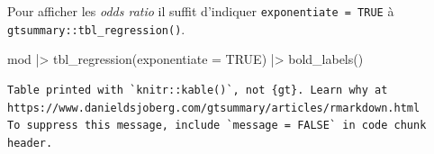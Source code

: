 \documentclass[
  letterpaper,
  DIV=11,
  numbers=noendperiod,
  oneside]{scrreprt}
\newenvironment{Shaded}{\begin{snugshade}}{\end{snugshade}}
\newcommand{\AttributeTok}[1]{\textcolor[rgb]{0.40,0.45,0.13}{#1}}
\newcommand{\ConstantTok}[1]{\textcolor[rgb]{0.56,0.35,0.01}{#1}}
\newcommand{\FunctionTok}[1]{\textcolor[rgb]{0.28,0.35,0.67}{#1}}
\newcommand{\NormalTok}[1]{\textcolor[rgb]{0.00,0.23,0.31}{#1}}
\newcommand{\SpecialCharTok}[1]{\textcolor[rgb]{0.37,0.37,0.37}{#1}}
\begin{document}
Pour afficher les \emph{odds ratio} il suffit d'indiquer
\texttt{exponentiate\ =\ TRUE} à \texttt{gtsummary::tbl\_regression()}.

\begin{Shaded}
\begin{Highlighting}[]
\NormalTok{mod }\SpecialCharTok{|\textgreater{}} 
  \FunctionTok{tbl\_regression}\NormalTok{(}\AttributeTok{exponentiate =} \ConstantTok{TRUE}\NormalTok{) }\SpecialCharTok{|\textgreater{}} 
  \FunctionTok{bold\_labels}\NormalTok{()}
\end{Highlighting}
\end{Shaded}

\begin{verbatim}
Table printed with `knitr::kable()`, not {gt}. Learn why at
https://www.danieldsjoberg.com/gtsummary/articles/rmarkdown.html
To suppress this message, include `message = FALSE` in code chunk header.
\end{verbatim}
\end{document}
